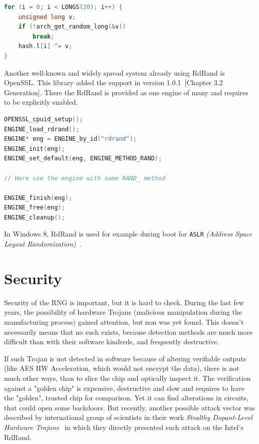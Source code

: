 \begin{lstlisting}[frame=none, basicstyle=\footnotesize\ttfamily, language=C, numbers=none, numberstyle=\tiny\color{black},caption= {Adding RdRand (and any other platform-depending HW RNG) to blocking pool with XOR, at line 1042 in {\tt drivers/char/random.c}~\cite{random.c}. }]
for (i = 0; i < LONGS(20); i++) {
	unsigned long v;
	if (!arch_get_random_long(&v))
		break;
	hash.l[i] ^= v;
}
\end{lstlisting}

\par{
Another well-known and widely spread system already using RdRand is OpenSSL. This library added the support in version 1.0.1~\cite{OpenSSLRandomNumbers}[Chapter 3.2 Generation]. There the RdRand is provided as one engine of many and requires to be explicitly enabled.
}

\begin{lstlisting}[frame=none, basicstyle=\footnotesize\ttfamily, language=C, numbers=none, numberstyle=\tiny\color{black},caption= {Simplified example of usage of RdRand in OpenSSL~\cite{OpenSSLRandomNumbers}. }]
OPENSSL_cpuid_setup();
ENGINE_load_rdrand();
ENGINE* eng = ENGINE_by_id("rdrand");
ENGINE_init(eng);
ENGINE_set_default(eng, ENGINE_METHOD_RAND);

// Here use the engine with some RAND_ method

ENGINE_finish(eng);
ENGINE_free(eng);
ENGINE_cleanup();
\end{lstlisting}

\par{
In Windows 8, RdRand is used for example during boot for {\tt ASLR} {\em (Address Space Layout Randomization)}~\cite{WindowsASLR,WindowsHeap}.
}

\section{Security}\label{sec:security}
\par{
Security of the RNG is important, but it is hard to check. During the last few years,
 the possibility of hardware Trojans (malicious manipulation during 
 the manufacturing process) gained attention, but non was yet found. This doesn't 
necessarily means that no such exists, because detection methods are 
much more difficult than with their software kindreds, and frequently destructive. 
}

\par{
If such Trojan is not detected in software because of altering verifiable outputs 
(like AES HW Acceleration, which would not encrypt the data), 
there is not much other ways, than to slice the chip and optically inspect it. 
The verification against a "golden chip" is expensive, destructive and slow 
and requires to have the "golden", trusted chip for comparison.
Yet it can find alterations in circuits, that could open some backdoors. 
But recently, another possible attack vector was described by international group
 of scientists in their work {\em Stealthy Dopant-Level Hardware Trojans}~\cite{DopantAttack} 
 in which they directly presented such attack on the Intel's RdRand.
}

